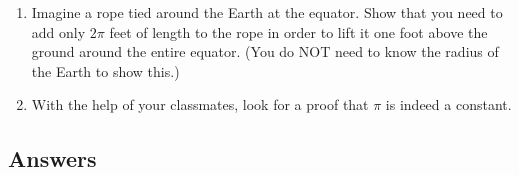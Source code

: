 \begin{enumerate}

\setcounter{enumi}{\value{HW}}

\item Imagine a rope tied around the Earth at the equator.  Show that you need to add only $2\pi$ feet of length to the rope in order to lift it one foot above the ground around the entire equator.  (You do NOT need to know the radius of the Earth to show this.)

\item With the help of your classmates, look for a proof that $\pi$ is indeed a constant.

\end{enumerate}

\newpage

\subsection{Answers}


